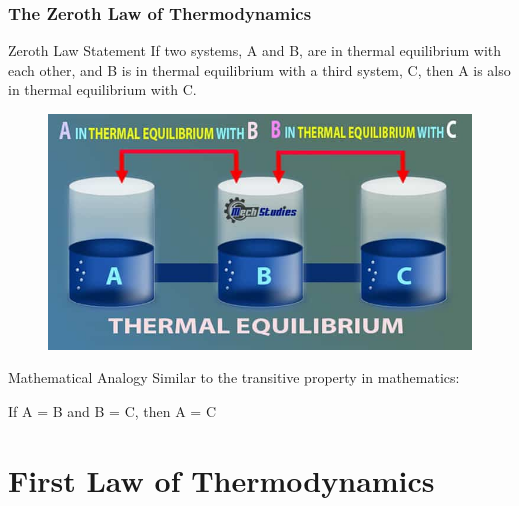\documentclass{beamer}
\begin{document}
\begin{frame}
    \frametitle{The Zeroth Law of Thermodynamics}
    \begin{block}{Zeroth Law Statement}
        If two systems, A and B, are in thermal equilibrium with each other, and B is in thermal equilibrium with a third system, C, then A is also in thermal equilibrium with C.
    \end{block}
    
    \begin{center}
        \begin{figure}
            \centering
            \includegraphics[width=0.5\linewidth]{phys11-thermo-zeroth-law.jpg}
        \end{figure}
    \end{center}
    
    \begin{exampleblock}{Mathematical Analogy}
        Similar to the transitive property in mathematics:
        
        If A = B and B = C, then A = C
    \end{exampleblock}
\end{frame}

\section{First Law of Thermodynamics}
\end{document}
